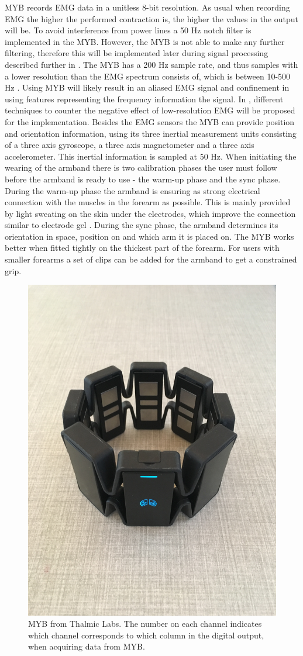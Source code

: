 MYB records EMG data in a unitless 8-bit resolution. As usual when recording EMG the higher the performed contraction is, the higher the values in the output will be. To avoid interference from power lines a 50 Hz notch filter is implemented in the MYB. However, the MYB is not able to make any further filtering, therefore this will be implemented later during signal processing described further in . The MYB has a 200 Hz sample rate, and thus samples with a lower resolution than the EMG spectrum consists of, which is between 10-500 Hz \cite{Cram2012}. Using MYB will likely result in an aliased EMG signal and confinement in using features representing the frequency information the signal. In , different techniques to counter the negative effect of low-resolution EMG will be proposed for the implementation. 
Besides the EMG sensors the MYB can provide position and orientation information, using its three inertial measurement units consisting of a three axis gyroscope, a three axis magnetometer and a three axis accelerometer. This inertial information is sampled at 50 Hz. \cite{Myoarmband2013} When initiating the wearing of the armband there is two calibration phases the user must follow before the armband is ready to use - the warm-up phase and the sync phase. During the warm-up phase the armband is ensuring as strong electrical connection with the muscles in the forearm as possible. This is mainly provided by light sweating on the skin under the electrodes, which improve the connection similar to electrode gel \cite{Cram2012}. During the sync phase, the armband determines its orientation in space, position on and which arm it is placed on. The MYB works better when fitted tightly on the thickest part of the forearm. For users with smaller forearms a set of clips can be added for the armband to get a constrained grip. \cite{Myoarmband2013}

\begin{figure}[H]                 
	\includegraphics[width=.4\textwidth]{figures/xBackground/myoband}  
	\caption{MYB from Thalmic Labs. The number on each channel indicates which channel corresponds to which column in the digital output, when acquiring data from MYB.}
	\label{fig:myoarmband} 
\end{figure}